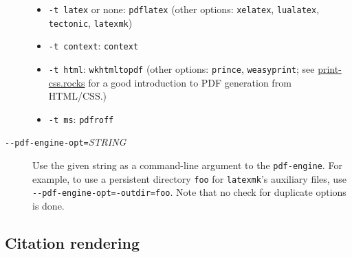 \documentclass[]{article}
\providecommand{\tightlist}{%
  \setlength{\itemsep}{0pt}\setlength{\parskip}{0pt}}
\begin{document}
\begin{description}
\begin{itemize}
\tightlist
\item
  \texttt{-t\ latex} or none: \texttt{pdflatex} (other options:
  \texttt{xelatex}, \texttt{lualatex}, \texttt{tectonic},
  \texttt{latexmk})
\item
  \texttt{-t\ context}: \texttt{context}
\item
  \texttt{-t\ html}: \texttt{wkhtmltopdf} (other options:
  \texttt{prince}, \texttt{weasyprint}; see
  \href{https://print-css.rocks}{print-css.rocks} for a good
  introduction to PDF generation from HTML/CSS.)
\item
  \texttt{-t\ ms}: \texttt{pdfroff}
\end{itemize}
\item[\texttt{-\/-pdf-engine-opt=}\emph{STRING}]
Use the given string as a command-line argument to the
\texttt{pdf-engine}. For example, to use a persistent directory
\texttt{foo} for \texttt{latexmk}'s auxiliary files, use
\texttt{-\/-pdf-engine-opt=-outdir=foo}. Note that no check for
duplicate options is done.
\end{description}

\hypertarget{citation-rendering}{%
\subsection{Citation rendering}\label{citation-rendering}}
\end{document}
